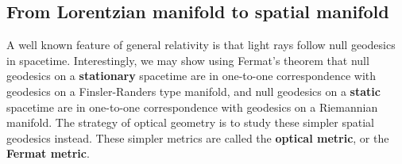 \subsection{From Lorentzian manifold to spatial manifold}
A well known feature of general relativity is that light rays follow null geodesics in spacetime.
Interestingly, we may show using Fermat's theorem \cite{PerlickV1990OFpi} that null geodesics on a \textbf{stationary} spacetime are in one-to-one correspondence with geodesics on a Finsler-Randers type manifold, and null geodesics on a \textbf{static} spacetime are in one-to-one correspondence with geodesics on a Riemannian manifold. The strategy of optical geometry is to study these simpler spatial geodesics instead. These simpler metrics are called the \textbf{optical metric}, or the \textbf{Fermat metric}.

